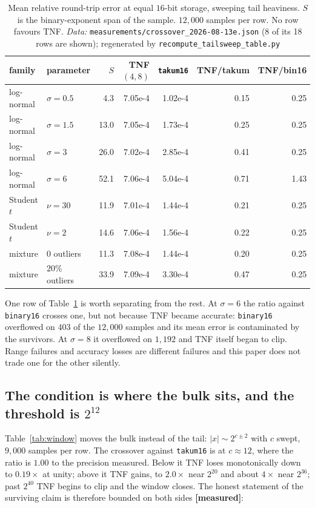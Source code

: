 \documentclass[11pt]{article}
\theoremstyle{definition}
\begin{document}
\begin{table}[htbp]\centering\small
\caption{Mean relative round-trip error at equal $16$-bit storage, sweeping tail
heaviness. $S$ is the binary-exponent span of the sample. $12{,}000$ samples per
row. No row favours TNF. \emph{Data:} \texttt{measurements/crossover\_2026-08-13e.json} (8 of its 18 rows are shown); regenerated by \texttt{recompute\_tailsweep\_table.py}}
\label{tab:tailsweep}
\begin{tabular}{llrrrrr}
\hline
family & parameter & $S$ & TNF$(4,8)$ & \texttt{takum16} & TNF/takum & TNF/bin16 \\
\hline
log-normal & $\sigma=0.5$ & 4.3 & 7.05e-4 & 1.02e-4 & 0.15 & 0.25 \\
log-normal & $\sigma=1.5$ & 13.0 & 7.05e-4 & 1.73e-4 & 0.25 & 0.25 \\
log-normal & $\sigma=3$ & 26.0 & 7.02e-4 & 2.85e-4 & 0.41 & 0.25 \\
log-normal & $\sigma=6$ & 52.1 & 7.06e-4 & 5.04e-4 & 0.71 & 1.43 \\
Student $t$ & $\nu=30$ & 11.9 & 7.01e-4 & 1.44e-4 & 0.21 & 0.25 \\
Student $t$ & $\nu=2$ & 14.6 & 7.06e-4 & 1.56e-4 & 0.22 & 0.25 \\
mixture & $0$ outliers & 11.3 & 7.08e-4 & 1.44e-4 & 0.20 & 0.25 \\
mixture & $20\%$ outliers & 33.9 & 7.09e-4 & 3.30e-4 & 0.47 & 0.25 \\
\hline
\end{tabular}
\end{table}

One row of Table~\ref{tab:tailsweep} is worth separating from the rest. At
$\sigma=6$ the ratio against \texttt{binary16} crosses one, but not because TNF
became accurate: \texttt{binary16} overflowed on $403$ of the $12{,}000$ samples and
its mean error is contaminated by the survivors. At $\sigma=8$ it overflowed on
$1{,}192$ and TNF itself began to clip. Range failures and accuracy losses are
different failures and this paper does not trade one for the other silently.

\subsection{The condition is where the bulk sits, and the threshold is $2^{12}$}

Table~\ref{tab:window} moves the bulk instead of the tail: $|x|\sim 2^{c\pm 2}$
with $c$ swept, $9{,}000$ samples per row. The crossover against \texttt{takum16}
is at $c\approx 12$, where the ratio is $1.00$ to the precision measured. Below it
TNF loses monotonically down to $0.19\times$ at unity; above it TNF gains, to
$2.0\times$ near $2^{20}$ and about $4\times$ near $2^{36}$; past $2^{40}$ TNF
begins to clip and the window closes. The honest statement of the surviving claim
is therefore bounded on both sides \textbf{[measured]}:
\end{document}

